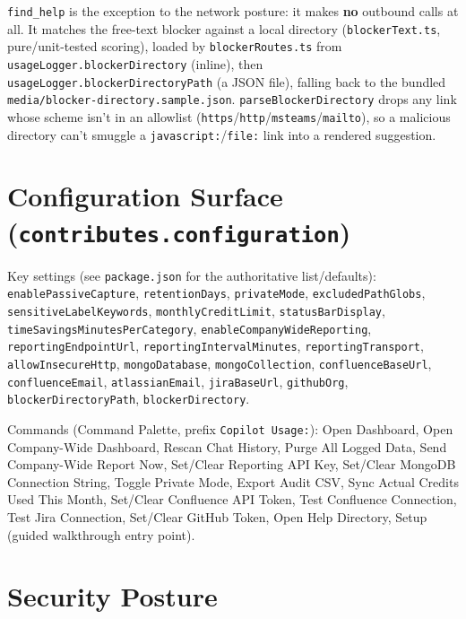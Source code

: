 \documentclass[11pt,a4paper]{article}
\newcommand{\code}[1]{\texttt{\color{lloydsblue!80!black}#1}}
\begin{document}
\code{find\_help} is the exception to the network posture: it makes
\textbf{no} outbound calls at all. It matches the free-text blocker against
a local directory (\code{blockerText.ts}, pure/unit-tested scoring), loaded
by \code{blockerRoutes.ts} from \code{usageLogger.blockerDirectory} (inline),
then \code{usageLogger.blockerDirectoryPath} (a JSON file), falling back to
the bundled \code{media/blocker-directory.sample.json}.
\code{parseBlockerDirectory} drops any link whose scheme isn't in an
allowlist (\code{https}/\code{http}/\code{msteams}/\code{mailto}), so a
malicious directory can't smuggle a \code{javascript:}/\code{file:} link
into a rendered suggestion.

\section{Configuration Surface (\texttt{contributes.configuration})}

Key settings (see \code{package.json} for the authoritative list/defaults):
\code{enablePassiveCapture}, \code{retentionDays}, \code{privateMode},
\code{excludedPathGlobs}, \code{sensitiveLabelKeywords},
\code{monthlyCreditLimit}, \code{statusBarDisplay},
\code{timeSavingsMinutesPerCategory}, \code{enableCompanyWideReporting},
\code{reportingEndpointUrl}, \code{reportingIntervalMinutes},
\code{reportingTransport}, \code{allowInsecureHttp}, \code{mongoDatabase},
\code{mongoCollection}, \code{confluenceBaseUrl}, \code{confluenceEmail},
\code{atlassianEmail}, \code{jiraBaseUrl}, \code{githubOrg},
\code{blockerDirectoryPath}, \code{blockerDirectory}.

Commands (Command Palette, prefix \code{Copilot Usage:}): Open Dashboard,
Open Company-Wide Dashboard, Rescan Chat History, Purge All Logged Data,
Send Company-Wide Report Now, Set/Clear Reporting API Key, Set/Clear
MongoDB Connection String, Toggle Private Mode, Export Audit CSV, Sync
Actual Credits Used This Month, Set/Clear Confluence API Token, Test
Confluence Connection, Test Jira Connection, Set/Clear GitHub Token, Open
Help Directory, Setup (guided walkthrough entry point).

\section{Security Posture}
\end{document}
